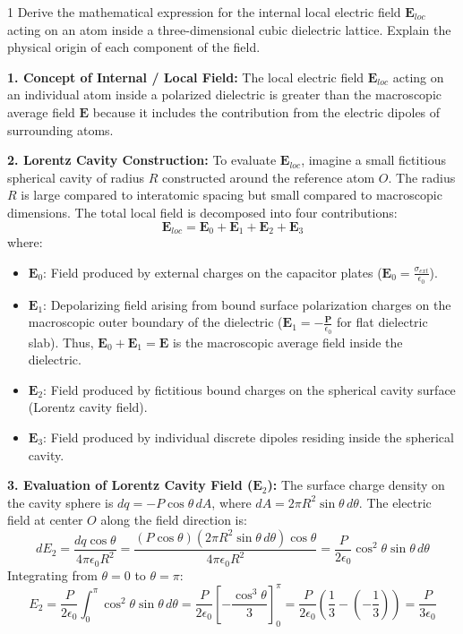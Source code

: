 \begin{theoryq}{1}
Derive the mathematical expression for the internal local electric field $\mathbf{E}_{loc}$ acting on an atom inside a three-dimensional cubic dielectric lattice. Explain the physical origin of each component of the field.
\end{theoryq}
\begin{theorysol}
\textbf{1. Concept of Internal / Local Field:}
The local electric field $\mathbf{E}_{loc}$ acting on an individual atom inside a polarized dielectric is greater than the macroscopic average field $\mathbf{E}$ because it includes the contribution from the electric dipoles of surrounding atoms.

\textbf{2. Lorentz Cavity Construction:}
To evaluate $\mathbf{E}_{loc}$, imagine a small fictitious spherical cavity of radius $R$ constructed around the reference atom $O$. The radius $R$ is large compared to interatomic spacing but small compared to macroscopic dimensions. The total local field is decomposed into four contributions:
\begin{equation}
\mathbf{E}_{loc} = \mathbf{E}_0 + \mathbf{E}_1 + \mathbf{E}_2 + \mathbf{E}_3
\end{equation}
where:
\begin{itemize}
\item $\mathbf{E}_0$: Field produced by external charges on the capacitor plates ($\mathbf{E}_0 = \frac{\sigma_{ext}}{\epsilon_0}$).
\item $\mathbf{E}_1$: Depolarizing field arising from bound surface polarization charges on the macroscopic outer boundary of the dielectric ($\mathbf{E}_1 = -\frac{\mathbf{P}}{\epsilon_0}$ for flat dielectric slab). Thus, $\mathbf{E}_0 + \mathbf{E}_1 = \mathbf{E}$ is the macroscopic average field inside the dielectric.
\item $\mathbf{E}_2$: Field produced by fictitious bound charges on the spherical cavity surface (Lorentz cavity field).
\item $\mathbf{E}_3$: Field produced by individual discrete dipoles residing inside the spherical cavity.
\end{itemize}

\textbf{3. Evaluation of Lorentz Cavity Field ($\mathbf{E}_2$):}
The surface charge density on the cavity sphere is $dq = -P \cos\theta\, dA$, where $dA = 2\pi R^2 \sin\theta\, d\theta$.
The electric field at center $O$ along the field direction is:
\begin{equation}
dE_2 = \frac{dq \cos\theta}{4\pi\epsilon_0 R^2} = \frac{(P\cos\theta)(2\pi R^2 \sin\theta\, d\theta)\cos\theta}{4\pi\epsilon_0 R^2} = \frac{P}{2\epsilon_0}\cos^2\theta \sin\theta\, d\theta
\end{equation}
Integrating from $\theta = 0$ to $\theta = \pi$:
\begin{equation}
E_2 = \frac{P}{2\epsilon_0}\int_{0}^{\pi} \cos^2\theta \sin\theta\, d\theta = \frac{P}{2\epsilon_0}\left[-\frac{\cos^3\theta}{3}\right]_0^\pi = \frac{P}{2\epsilon_0}\left(\frac{1}{3} - \left(-\frac{1}{3}\right)\right) = \frac{P}{3\epsilon_0}
\end{equation}


\end{theorysol}
